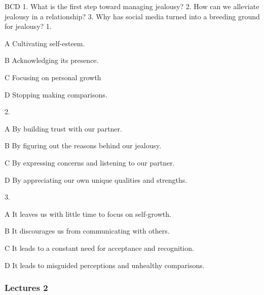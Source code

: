 \begin{enumerate}
	BCD
	1. What is the first step toward managing jealousy?
	2. How can we alleviate jealousy in a relationship?
	3. Why has social media turned into a breeding ground for jealousy?
	1.
	
	A
	Cultivating self-esteem.
	
	B
	Acknowledging its presence.
	
	C
	Focusing on personal growth
	
	D
	Stopping making comparisons.
	
	2.
	
	A
	By building trust with our partner.
	
	B
	By figuring out the reasons behind our jealousy.
	
	C
	By expressing concerns and listening to our partner.
	
	D
	By appreciating our own unique qualities and strengths.
	
	3.
	
	A
	It leaves us with little time to focus on self-growth.
	
	B
	It discourages us from communicating with others.
	
	C
	It leads to a constant need for acceptance and recognition.
	
	D
	It leads to misguided perceptions and unhealthy comparisons.
\end{enumerate}


\subsubsection{Lectures 2}

